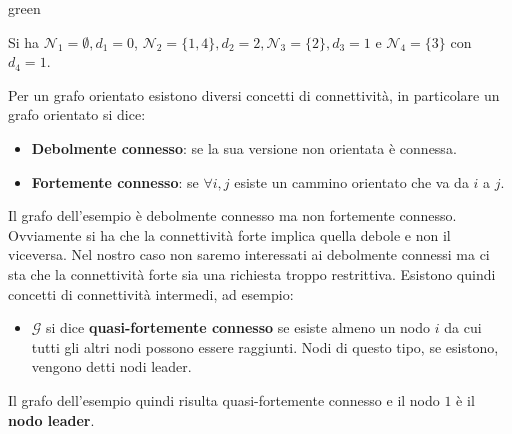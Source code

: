 \begin{mybox}{green}{}
\begin{center}
\end{center}
Si ha $\mathcal{N}_1 = \emptyset, d_1 = 0$, $\mathcal{N}_2 = \{1, 4\}, d_2 = 2, \mathcal{N}_3 = \{2\}, d_3 = 1$ e $\mathcal{N}_4 = \{3\}$ con $d_4 = 1$.
\end{mybox}

Per un grafo orientato esistono diversi concetti di connettivit\`a, in particolare un grafo orientato si dice:
\begin{itemize}
\item \textbf{Debolmente connesso}: se la sua versione non orientata \`e connessa.
\item \textbf{Fortemente connesso}: se $\forall i,j$ esiste un cammino orientato che va da $i$ a $j$. 
\end{itemize}

Il grafo dell'esempio \`e debolmente connesso ma non fortemente connesso. Ovviamente si ha che la connettivit\`a forte implica quella debole e non il viceversa. Nel nostro caso non saremo interessati ai debolmente connessi ma ci sta che la connettivit\`a forte sia una richiesta troppo restrittiva. Esistono quindi concetti di connettivit\`a intermedi, ad esempio:
\begin{itemize}
    \item $\mathcal{G}$ si dice \textbf{quasi-fortemente connesso} se esiste almeno un nodo $i$ da cui tutti gli altri nodi possono essere raggiunti. Nodi di questo tipo, se esistono, vengono detti nodi leader.
\end{itemize}

Il grafo dell'esempio quindi risulta quasi-fortemente connesso e il nodo $1$ \`e il \textbf{nodo leader}.

